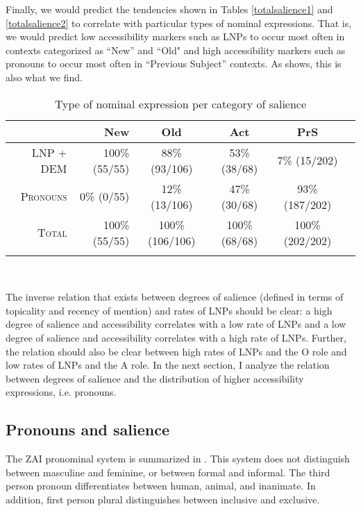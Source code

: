 Finally, we would predict the tendencies shown in Tables \ref{totalsalience1} and \ref{totalsalience2} to correlate with particular types of nominal expressions. That is, we would predict low accessibility markers such as LNPs to occur most often in contexts categorized as ``New'' and ``Old" and high accessibility markers such as pronouns to occur most often in ``Previous Subject'' contexts. As  shows, this is also what we find.
\begin{table}

\caption{{Type of nominal expression per category of salience}}
\begin{tabular}{| r | r  c  c  c  c }
\lsptoprule
 & New & Old & Act & PrS \\

\midrule
\textsc{LNP + DEM} &  100{\%} (55/55) &  88{\%} (93/106) & 53{\%} (38/68) & 7{\%} (15/202) \\

\midrule
\textsc{Pronouns} & 0{\%} (0/55) & 12{\%} (13/106) & 47{\%} (30/68) & 93{\%} (187/202) \\

\midrule 
\textsc{Total} & 100{\%} (55/55) & 100{\%} (106/106) & 100{\%} (68/68) &100{\%} (202/202) \\

\lspbottomrule
\end{tabular}\\
\label{saliencetype}

\end{table}

The inverse relation that exists between degrees of salience (defined in terms of topicality and recency of mention) and rates of LNPs should be clear: a high degree of salience and accessibility correlates with a low rate of LNPs and a low degree of salience and accessibility correlates with a high rate of LNPs. Further, the relation should also be clear between high rates of LNPs and the O role and low rates of LNPs and the A role. In the next section, I analyze the relation between degrees of salience and the distribution of higher accessibility expressions, i.e. pronouns. 



\subsection{Pronouns and salience}\label{izpronouns}

The ZAI pronominal system is summarized in . This system does not distinguish between masculine and feminine, or between formal and informal. The third person pronoun differentiates between human, animal, and inanimate. In addition, first person plural distinguishes between inclusive and exclusive.

